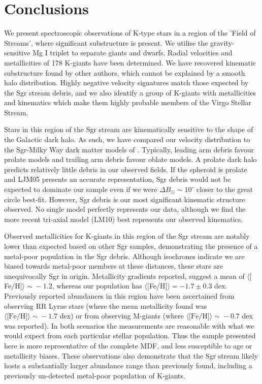 	
\section{Conclusions}
\label{sec:ch1-conclusions}

	We present spectroscopic observations of K-type stars in a region of the 'Field of Streams', where significant substructure is present. We utilise the gravity-sensitive Mg I triplet to separate giants and dwarfs. Radial velocities and metallicities of 178 K-giants have been determined. We have recovered kinematic substructure found by other authors, which cannot be explained by a smooth halo distribution. Highly negative velocity signatures match those expected by the Sgr stream debris, and we also identify a group of K-giants with metallicities and kinematics which make them highly probable members of the Virgo Stellar Stream.

	Stars in this region of the Sgr stream are kinematically sensitive to the shape of the Galactic dark halo. As such, we have compared our velocity distribution to the Sgr-Milky Way dark matter models of \citet{Law;et-al_2005, Law;Majewski_2010}. Typically, leading arm debris favour prolate models and trailing arm debris favour oblate models. A prolate dark halo predicts relatively little debris in our observed fields. If the spheroid is prolate and LJM05 presents an accurate representation, Sgr debris would not be expected to dominate our sample even if we were $\Delta{}B_\odot\sim10^\circ$ closer to the great circle best-fit. However, Sgr debris is our most significant kinematic structure observed. No single model perfectly represents our data, although we find the more recent tri-axial model (LM10) best represents our observed kinematics. 
	
	Observed metallicities for K-giants in this region of the Sgr stream are notably lower than expected based on other Sgr samples, demonstrating the presence of a metal-poor population in the  Sgr debris. Although isochrones indicate we are biased towards metal-poor members at these distances, these stars are unequivocally Sgr in origin. Metallicity gradients reported, suggest a mean of $\langle[$Fe/H$]\rangle\sim{}-1.2$, whereas our population has $\langle[$Fe/H$]\rangle = -1.7 \pm 0.3$ dex. Previously reported abundances in this region have been ascertained from observing RR Lyrae stars (where the mean metallicity found was $\langle\mbox{[Fe/H]}\rangle\sim{}-1.7$ dex) or from observing M-giants (where $\langle\mbox{[Fe/H]}\rangle\sim{}-0.7$ dex was reported). In both scenarios the measurements are reasonable with what we would expect from each particular stellar population. Thus the sample presented here is more representative of the complete MDF, and less susceptible  to age or metallicity biases. These observations also demonstrate that the Sgr stream likely hosts a substantially larger abundance range than previously found, including a previously un-detected metal-poor population of K-giants.

